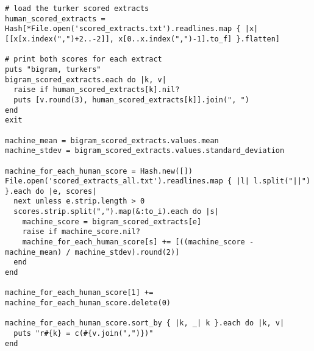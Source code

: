 \documentclass{article}
\begin{document}
\begin{verbatim}
# load the turker scored extracts
human_scored_extracts = Hash[*File.open('scored_extracts.txt').readlines.map { |x| [[x[x.index(",")+2..-2]], x[0..x.index(",")-1].to_f] }.flatten]

# print both scores for each extract
puts "bigram, turkers"
bigram_scored_extracts.each do |k, v|
  raise if human_scored_extracts[k].nil?
  puts [v.round(3), human_scored_extracts[k]].join(", ")
end
exit

machine_mean = bigram_scored_extracts.values.mean
machine_stdev = bigram_scored_extracts.values.standard_deviation

machine_for_each_human_score = Hash.new([])
File.open('scored_extracts_all.txt').readlines.map { |l| l.split("||") }.each do |e, scores|
  next unless e.strip.length > 0
  scores.strip.split(",").map(&:to_i).each do |s|
    machine_score = bigram_scored_extracts[e]
    raise if machine_score.nil?
    machine_for_each_human_score[s] += [((machine_score - machine_mean) / machine_stdev).round(2)]
  end
end

machine_for_each_human_score[1] += machine_for_each_human_score.delete(0)

machine_for_each_human_score.sort_by { |k, _| k }.each do |k, v|
  puts "r#{k} = c(#{v.join(",")})"
end


\end{verbatim}
\pagebreak
\end{document}
